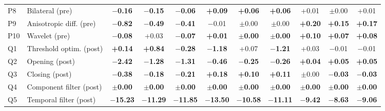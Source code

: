 \begin{table}[t]
\begin{tabularx}{\textwidth}{L{0.6cm} Y *{9}{c}}
P8 & Bilateral (pre) & \textbf{$-$0.16} & \textbf{$-$0.15} & \textbf{$-$0.06} & \textbf{+0.09} & \textbf{+0.06} & \textbf{+0.06} & +0.01 & $\pm$0.00 & +0.01 \\
P9 & Anisotropic diff. (pre) & \textbf{$-$0.82} & \textbf{$-$0.49} & \textbf{$-$0.41} & $-$0.01 & $\pm$0.00 & $\pm$0.00 & \textbf{+0.20} & \textbf{+0.15} & \textbf{+0.17} \\
P10 & Wavelet (pre) & \textbf{$-$0.08} & +0.03 & \textbf{$-$0.07} & \textbf{+0.01} & \textbf{$\pm$0.00} & \textbf{$\pm$0.00} & \textbf{+0.10} & \textbf{+0.07} & \textbf{+0.08} \\
\midrule
Q1 & Threshold optim. (post) & \textbf{+0.14} & \textbf{+0.84} & \textbf{$-$0.28} & \textbf{$-$1.18} & +0.07 & \textbf{$-$1.21} & +0.03 & $-$0.01 & $-$0.01 \\
Q2 & Opening (post) & \textbf{$-$2.42} & \textbf{$-$1.28} & \textbf{$-$1.31} & \textbf{$-$0.46} & \textbf{$-$0.25} & \textbf{$-$0.26} & \textbf{+0.04} & \textbf{+0.05} & \textbf{+0.05} \\
Q3 & Closing (post) & \textbf{$-$0.38} & \textbf{$-$0.18} & \textbf{$-$0.21} & \textbf{+0.18} & \textbf{+0.10} & \textbf{+0.11} & $\pm$0.00 & \textbf{$-$0.03} & \textbf{$-$0.03} \\
Q4 & Component filter (post) & \textbf{$\pm$0.00} & \textbf{$\pm$0.00} & \textbf{$\pm$0.00} & \textbf{$\pm$0.00} & \textbf{$\pm$0.00} & \textbf{$\pm$0.00} & \textbf{$\pm$0.00} & \textbf{$\pm$0.00} & \textbf{$\pm$0.00} \\
Q5 & Temporal filter (post) & \textbf{$-$15.23} & \textbf{$-$11.29} & \textbf{$-$11.85} & \textbf{$-$13.50} & \textbf{$-$10.58} & \textbf{$-$11.11} & \textbf{$-$9.42} & \textbf{$-$8.63} & \textbf{$-$9.06} \\
\bottomrule
\end{tabularx}
\end{table}
